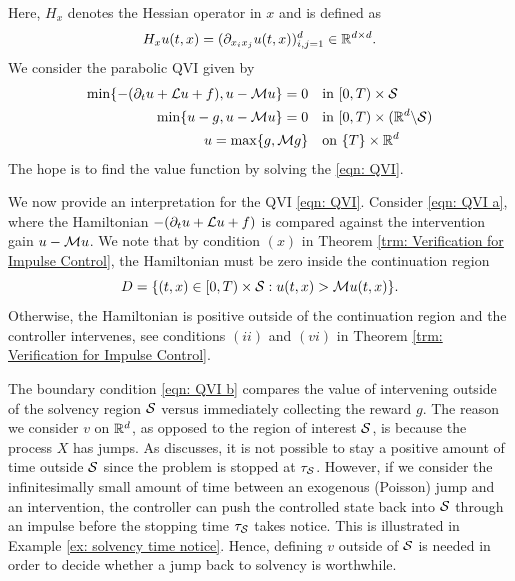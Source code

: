 Here, $H_x$ denotes the Hessian operator in $x$ and is defined as
\begin{equation*}
    H_x u(t,x) = (\partial_{x_i x_j}u(t,x))_{i,j=1}^d \in \mathbb{R}^{d \times d}.
\end{equation*}
We consider the parabolic QVI given by
\begin{subequations}
    \label{eqn: QVI}
    \begin{align}
    \min \{-(\partial_t u + \mathcal{L} u + f), u - \mathcal{M} u \} = 0 & \quad \text{in } [0,T) \times \mathcal{S} \label{eqn: QVI a} \\
    \min \{u-g, u - \mathcal{M} u \} = 0 & \quad \text{in } [0,T) \times (\mathbb{R}^d \backslash \mathcal{S} ) \label{eqn: QVI b} \\
    u = \max \{g, \mathcal{M} g \} & \quad \text{on } \{T\} \times \mathbb{R}^d \label{eqn: QVI c}
\end{align}
\end{subequations}
The hope is to find the value function by solving the \eqref{eqn: QVI}.

We now provide an interpretation for the QVI \eqref{eqn: QVI}. Consider \eqref{eqn: QVI a}, where the Hamiltonian $-(\partial_t u + \mathcal{L} u + f)$ is compared against the intervention gain $u-\mathcal{M} u$. We note that by condition $(x)$ in Theorem \ref{trm: Verification for Impulse Control}, the Hamiltonian must be zero inside the continuation region 
$$D=\{(t,x) \in [0,T)\times \mathcal{S}: u(t,x)>\mathcal{M} u(t,x)\}.$$
Otherwise, the Hamiltonian is positive outside of the continuation region and the controller intervenes, see conditions $(ii)$ and $(vi)$ in Theorem \ref{trm: Verification for Impulse Control}. 

The boundary condition \eqref{eqn: QVI b} compares the value of intervening outside of the solvency region $\mathcal{S}$ versus immediately collecting the reward $g$. The reason we consider $v$ on $\mathbb{R}^d$, as opposed to the region of interest $\mathcal{S}$, is because the process $X$ has jumps. As \textcite{seydel2010generalexistenceuniquenessviscosity} discusses, it is not possible to stay a positive amount of time outside $\mathcal{S}$ since the problem is stopped at $\tau_{\mathcal{S}}$. However, if we consider the infinitesimally small amount of time between an exogenous (Poisson) jump and an intervention, the controller can push the controlled state back into $\mathcal{S}$ through an impulse before the stopping time $\tau_{\mathcal{S}}$ takes notice. This is illustrated in Example \ref{ex: solvency time notice}. Hence, defining $v$ outside of $\mathcal{S}$ is needed in order to decide whether a jump back to solvency is worthwhile. 

